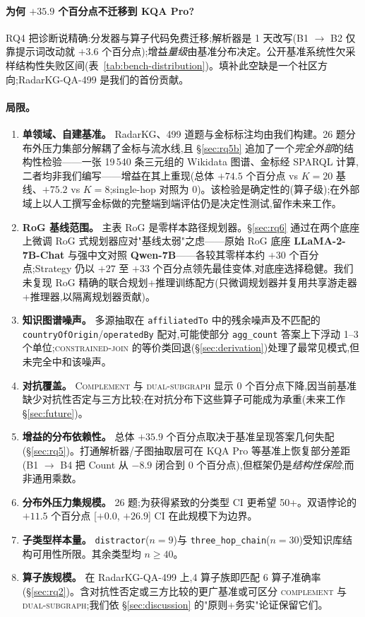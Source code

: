 \documentclass[11pt,a4paper]{article}
\newcommand{\qtype}[1]{\texttt{\small #1}}
\newcommand{\op}[1]{\textsc{\small #1}}
\begin{document}
\paragraph{为何 \texorpdfstring{$+35.9$}{+35.9} 个百分点不迁移到 KQA Pro?}
RQ4 把诊断说精确:分发器与算子代码免费迁移;解析器是 1 天改写(B1 $\to$ B2 仅靠提示词改动就 $+3.6$ 个百分点);增益\emph{量级}由基准分布决定。公开基准系统性欠采样结构性失败区间(表~\ref{tab:bench-distribution})。填补此空缺是一个社区方向;RadarKG-QA-499 是我们的首份贡献。

\paragraph{局限。}
\begin{enumerate}[topsep=0pt,itemsep=2pt,leftmargin=*]
  \item \textbf{单领域、自建基准。} RadarKG、499 道题与金标标注均由我们构建。26 题分布外压力集部分解耦了金标与流水线,且 \S\ref{sec:rq5b} 追加了一个\emph{完全外部}的结构性检验——一张 19\,540 条三元组的 Wikidata 图谱、金标经 SPARQL 计算,二者均非我们编写——增益在其上重现(总体 $+74.5$ 个百分点 vs $K{=}20$ 基线、$+75.2$ vs $K{=}8$;single-hop 对照为 $0$)。该检验是确定性的(算子级);在外部域上以人工撰写金标做的完整端到端评估仍是决定性测试,留作未来工作。
  \item \textbf{RoG 基线范围。} 主表 RoG 是零样本路径规划器。\S\ref{sec:rq6} 通过在两个底座上微调 RoG 式规划器应对"基线太弱"之虑——原始 RoG 底座 \textbf{LLaMA-2-7B-Chat} \citep{luo2024rog} 与强中文对照 \textbf{Qwen-7B}——各较其零样本约 $+30$ 个百分点;Strategy 仍以 $+27$ 至 $+33$ 个百分点领先最佳变体,对底座选择稳健。我们未复现 RoG 精确的联合规划+推理训练配方(只微调规划器并复用共享游走器+推理器,以隔离规划器贡献)。
  \item \textbf{知识图谱噪声。} 多源抽取在 \texttt{affiliatedTo} 中的残余噪声及不匹配的 \texttt{countryOfOrigin}/\texttt{operatedBy} 配对,可能使部分 \qtype{agg\_count} 答案上下浮动 1--3 个单位;\op{constrained-join} 的等价类回退(\S\ref{sec:derivation})处理了最常见模式,但未完全中和该噪声。
  \item \textbf{对抗覆盖。} \op{Complement} 与 \op{dual-subgraph} 显示 0 个百分点下降,因当前基准缺少对抗性否定与三方比较;在对抗分布下这些算子可能成为承重(未来工作 \S\ref{sec:future})。
  \item \textbf{增益的分布依赖性。} 总体 $+35.9$ 个百分点取决于基准呈现答案几何失配(\S\ref{sec:rq5})。打通解析器/子图抽取层可在 KQA Pro 等基准上恢复部分差距(B1 $\to$ B4 把 Count 从 $-8.9$ 闭合到 0 个百分点),但框架仍是\emph{结构性保险},而非通用乘数。
  \item \textbf{分布外压力集规模。} 26 题;为获得紧致的分类型 CI 更希望 50+。双语悖论的 $+11.5$ 个百分点 [$+0.0$, $+26.9$] CI 在此规模下为边界。
  \item \textbf{子类型样本量。} \qtype{distractor}($n\!=\!9$)与 \qtype{three\_hop\_chain}($n\!=\!30$)受知识库结构可用性所限。其余类型均 $n \geq 40$。
  \item \textbf{算子族规模。} 在 RadarKG-QA-499 上,4 算子族即匹配 6 算子准确率(\S\ref{sec:rq2})。含对抗性否定或三方比较的更广基准或可区分 \op{complement} 与 \op{dual-subgraph};我们依 \S\ref{sec:discussion} 的"原则+务实"论证保留它们。
\end{enumerate}
\end{document}
